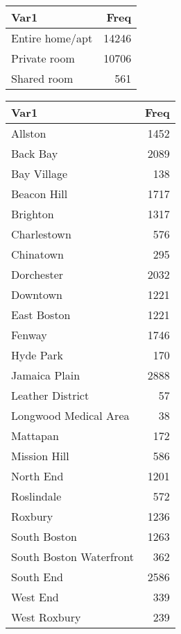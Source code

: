 \documentclass[]{article}
\newenvironment{Shaded}{\begin{snugshade}}{\end{snugshade}}
\newcommand{\KeywordTok}[1]{\textcolor[rgb]{0.13,0.29,0.53}{\textbf{#1}}}
\newcommand{\OperatorTok}[1]{\textcolor[rgb]{0.81,0.36,0.00}{\textbf{#1}}}
\newcommand{\NormalTok}[1]{#1}
\begin{document}
\begin{tabular}{l|r}
\hline
Var1 & Freq\\
\hline
Entire home/apt & 14246\\
\hline
Private room & 10706\\
\hline
Shared room & 561\\
\hline
\end{tabular}

\begin{Shaded}
\end{Shaded}

\begin{tabular}{l|r}
\hline
Var1 & Freq\\
\hline
Allston & 1452\\
\hline
Back Bay & 2089\\
\hline
Bay Village & 138\\
\hline
Beacon Hill & 1717\\
\hline
Brighton & 1317\\
\hline
Charlestown & 576\\
\hline
Chinatown & 295\\
\hline
Dorchester & 2032\\
\hline
Downtown & 1221\\
\hline
East Boston & 1221\\
\hline
Fenway & 1746\\
\hline
Hyde Park & 170\\
\hline
Jamaica Plain & 2888\\
\hline
Leather District & 57\\
\hline
Longwood Medical Area & 38\\
\hline
Mattapan & 172\\
\hline
Mission Hill & 586\\
\hline
North End & 1201\\
\hline
Roslindale & 572\\
\hline
Roxbury & 1236\\
\hline
South Boston & 1263\\
\hline
South Boston Waterfront & 362\\
\hline
South End & 2586\\
\hline
West End & 339\\
\hline
West Roxbury & 239\\
\hline
\end{tabular}
\end{document}
